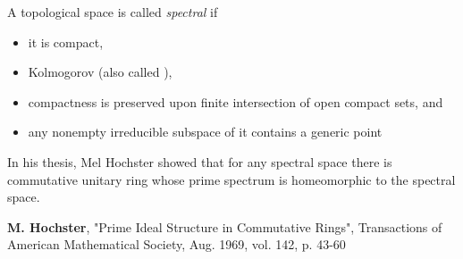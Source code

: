 \documentclass[12pt]{article}
\begin{document}
A topological space is called \emph{spectral} if 
\begin{itemize}
\item it is compact, 
\item Kolmogorov (also called ), 
\item compactness is preserved upon finite intersection of open compact sets, and 
\item any nonempty irreducible subspace of it contains a generic point
\end{itemize}

In his thesis, Mel Hochster showed that for any spectral space there is commutative unitary ring whose prime spectrum is homeomorphic to the spectral space.

\begin{thebibliography}{99}

\textbf{M. Hochster},
"Prime Ideal Structure in Commutative Rings", 
Transactions of American Mathematical Society, Aug. 1969, vol. 142, p. 43-60

\end{thebibliography}
\end{document}
